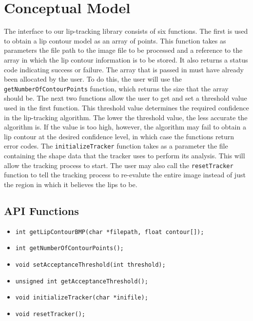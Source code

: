 \chapter{Conceptual Model}

The interface to our lip-tracking library consists of six functions. The first is used to obtain a lip contour model as an array of points. This function takes as parameters the file path to the image file to be processed and a reference to the array in which the lip contour information is to be stored. It also returns a status code indicating success or failure. The array that is passed in must have already been allocated by the user. To do this, the user will use the \texttt{getNumberOfContourPoints} function, which returns the size that the array should be. The next two functions allow the user to get and set a threshold value used in the first function. This threshold value determines the required confidence in the lip-tracking algorithm. The lower the threshold value, the less accurate the algorithm is. If the value is too high, however, the algorithm may fail to obtain a lip contour at the desired confidence level, in which case the functions return error codes. The \texttt{initializeTracker} function takes as a parameter the file containing the shape data that the tracker uses to perform its analysis. This will allow the tracking process to start. The user may also call the \texttt{resetTracker} function to tell the tracking process to re-evalute the entire image instead of just the region in which it believes the lips to be.

\section{API Functions}
\begin{itemize}
\item \texttt{int getLipContourBMP(char *filepath, float contour[]);}
\item \texttt{int getNumberOfContourPoints();}
\item \texttt{void setAcceptanceThreshold(int threshold);}
\item \texttt{unsigned int getAcceptanceThreshold();}
\item \texttt{void initializeTracker(char *inifile);}
\item \texttt{void resetTracker();}
\end{itemize}
